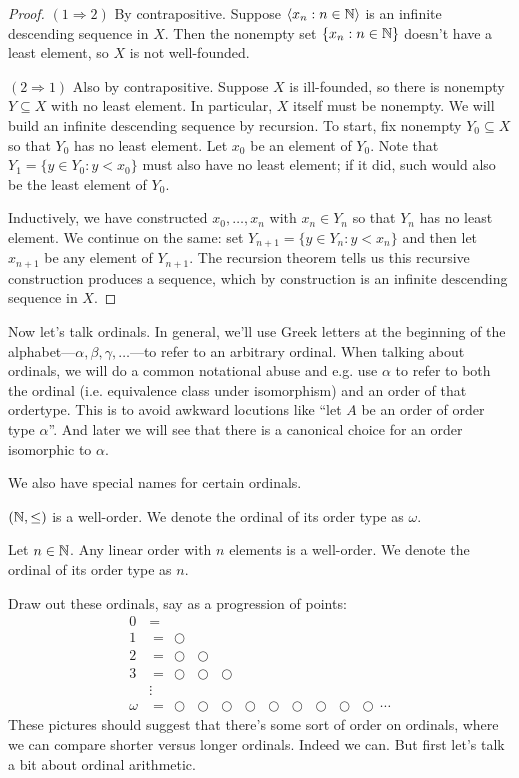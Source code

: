 \documentclass[10pt]{amsart}
\begin{document}
\begin{proof}
$(1 \Rightarrow 2)$ By contrapositive. Suppose ${\left\langle x_n : n \in \mathbb{N} \right\rangle}$ is an infinite descending sequence in $X$. Then the nonempty set $\{ x_n : n \in \mathbb{N}\}$ doesn't have a least element, so $X$ is not well-founded.

$(2 \Rightarrow 1)$ Also by contrapositive. Suppose $X$ is ill-founded, so there is nonempty $Y \subseteq X$ with no least element. In particular, $X$ itself must be nonempty. We will build an infinite descending sequence by recursion. To start, fix nonempty $Y_0 \subseteq X$ so that $Y_0$ has no least element. Let $x_0$ be an element of $Y_0$. Note that $Y_1 = \{ y \in Y_0 : y < x_0 \}$ must also have no least element; if it did, such would also be the least element of $Y_0$.

Inductively, we have constructed $x_0, \ldots, x_n$ with $x_n \in Y_n$ so that $Y_n$ has no least element. We continue on the same: set $Y_{n+1} = \{ y \in Y_n : y < x_n \}$ and then let $x_{n+1}$ be any element of $Y_{n+1}$. The recursion theorem tells us this recursive construction produces a sequence, which by construction is an infinite descending sequence in $X$.
\end{proof}

Now let's talk ordinals. In general, we'll use Greek letters at the beginning of the alphabet---$\alpha,\beta,\gamma,\ldots$---to refer to an arbitrary ordinal. When talking about ordinals, we will do a common notational abuse and e.g. use $\alpha$ to refer to both the ordinal (i.e. equivalence class under isomorphism) and an order of that ordertype. This is to avoid awkward locutions like ``let $A$ be an order of order type $\alpha$''. And later we will see that there is a canonical choice for an order isomorphic to $\alpha$.

We also have special names for certain ordinals.

\begin{example}
$(\mathbb{N},\le)$ is a well-order. We denote the ordinal of its order type as $\omega$.
\end{example}

\begin{example}
Let $n \in \mathbb{N}$. Any linear order with $n$ elements is a well-order. We denote the ordinal of its order type as $n$.
\end{example}

Draw out these ordinals, say as a progression of points:
\newcommand\mycirc{\mathord{\,\bigcirc\,}}
\begin{align*}
0 &= \\
1 &= \mycirc \\
2 &= \mycirc \mycirc \\
3 &= \mycirc \mycirc \mycirc \\
&\vdots \\
\omega &= \mycirc \mycirc \mycirc \mycirc \mycirc \mycirc \mycirc \mycirc \mycirc \cdots
\end{align*}
These pictures should suggest that there's some sort of order on ordinals, where we can compare shorter versus longer ordinals. Indeed we can. But first let's talk a bit about ordinal arithmetic.
\end{document}
